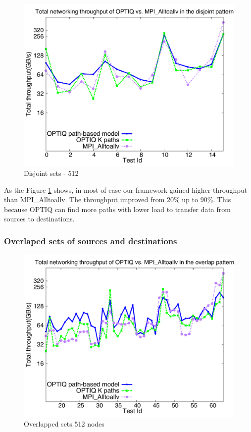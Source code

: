 \begin{figure}[!htb]
\vspace{-0.1in}
\centering
\includegraphics[scale=0.30]{figures/disjoint_512.pdf}
\vspace{-0.1in}
\caption{Disjoint sets - 512}
\vspace{-0.1in}
\label{fig:disjoint_512}
\end{figure}

As the Figure \ref{fig:disjoint_512} shows, in most of case our framework gained higher throughput than MPI\_Alltoallv. The throughput improved from 20\% up to 90\%. This because OPTIQ can find more paths with lower load to transfer data from sources to destinations.

\subsubsection{Overlaped sets of sources and destinations}

\begin{figure}[!htb]
\vspace{-0.1in}
\centering
\includegraphics[scale=0.30]{figures/overlap_512.pdf}
\vspace{-0.1in}
\caption{Overlapped sets 512 nodes}
\vspace{-0.1in}
\label{fig:overlap_512}
\end{figure}

